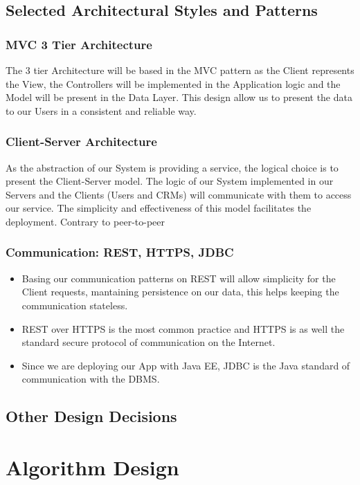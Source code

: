 \documentclass[a4paper]{article}
\begin{document}
\subsection{Selected Architectural Styles and Patterns}
\subsubsection{MVC 3 Tier Architecture}
The 3 tier Architecture will be based in the MVC pattern as the Client represents the View, the Controllers will be implemented in the Application logic and the Model will be present in the Data Layer. This design allow us to present the data to our Users in a consistent and reliable way.
\subsubsection{Client-Server Architecture}
As the abstraction of our System is providing a service, the logical choice is to present the Client-Server model. The logic of our System implemented in our Servers and the Clients (Users and CRMs) will communicate with them to access our service. The simplicity and effectiveness of this model facilitates the deployment. Contrary to peer-to-peer 

\subsubsection{Communication: REST, HTTPS, JDBC}
\begin{itemize}
\item Basing our communication patterns on REST will allow simplicity for the Client requests, mantaining persistence on our data, this helps keeping the communication stateless. 
\item  REST over HTTPS is the most common practice and HTTPS is as well the standard secure protocol of communication on the Internet. 
\item Since we are deploying our App with Java EE, JDBC is the Java standard of communication with the DBMS.
\end{itemize}

\subsection{Other Design Decisions}

\newpage
\section{Algorithm Design}
\end{document}
